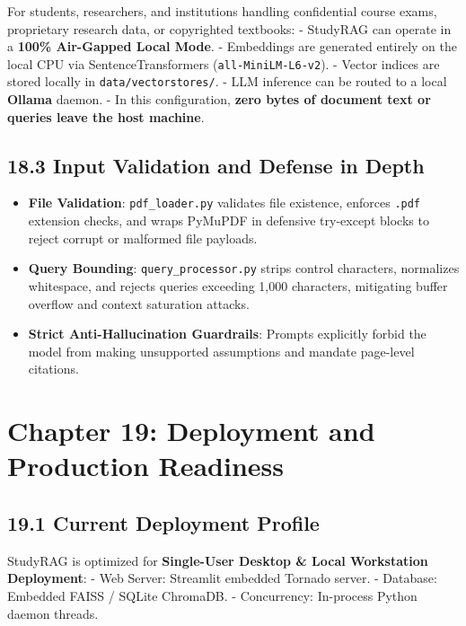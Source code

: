\documentclass[
]{article}
\providecommand{\tightlist}{%
  \setlength{\itemsep}{0pt}\setlength{\parskip}{0pt}}
\begin{document}
For students, researchers, and institutions handling confidential course
exams, proprietary research data, or copyrighted textbooks: - StudyRAG
can operate in a \textbf{100\% Air-Gapped Local Mode}. - Embeddings are
generated entirely on the local CPU via SentenceTransformers
(\texttt{all-MiniLM-L6-v2}). - Vector indices are stored locally in
\texttt{data/\allowbreak vectorstores/\allowbreak }. - LLM inference can be routed to a local
\textbf{Ollama} daemon. - In this configuration, \textbf{zero bytes of
document text or queries leave the host machine}.

\subsection{18.3 Input Validation and Defense in
Depth}\label{input-validation-and-defense-in-depth}

\begin{itemize}
\tightlist
\item
  \textbf{File Validation}: \texttt{pdf\_\allowbreak loader.\allowbreak py} validates file
  existence, enforces \texttt{.\allowbreak pdf} extension checks, and wraps PyMuPDF
  in defensive try-except blocks to reject corrupt or malformed file
  payloads.
\item
  \textbf{Query Bounding}: \texttt{query\_\allowbreak processor.\allowbreak py} strips control
  characters, normalizes whitespace, and rejects queries exceeding 1,000
  characters, mitigating buffer overflow and context saturation attacks.
\item
  \textbf{Strict Anti-Hallucination Guardrails}: Prompts explicitly
  forbid the model from making unsupported assumptions and mandate
  page-level citations.
\end{itemize}

\section{Chapter 19: Deployment and Production
Readiness}\label{chapter-19-deployment-and-production-readiness}

\subsection{19.1 Current Deployment
Profile}\label{current-deployment-profile}

StudyRAG is optimized for \textbf{Single-User Desktop \& Local
Workstation Deployment}: - Web Server: Streamlit embedded Tornado
server. - Database: Embedded FAISS / SQLite ChromaDB. - Concurrency:
In-process Python daemon threads.
\end{document}

